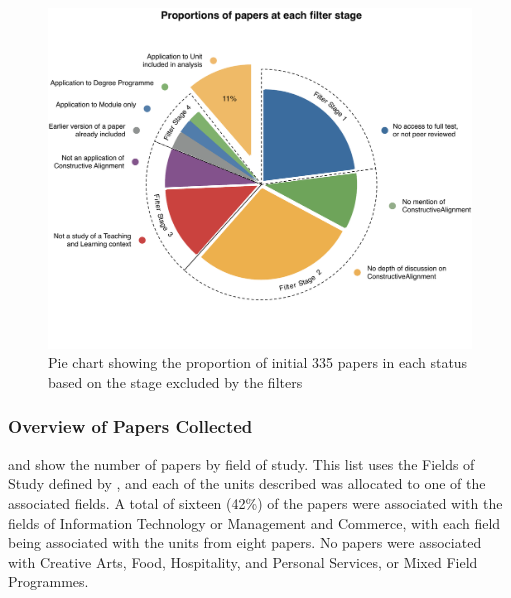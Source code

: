 \begin{figure}[p]
	\centering
	\includegraphics[width=\textwidth]{FilterResults}
	\caption{Pie chart showing the proportion of initial 335 papers in each status based on the stage excluded by the filters}
	\label{fig:filter_results}
\end{figure}

\subsubsection{Overview of Papers Collected} %
\label{sub:overview_of_papers_collected}

 and  show the number of papers by field of study. This list uses the Fields of Study defined by \citet{Trewin:2000}, and each of the units described was allocated to one of the associated fields. A total of sixteen (42\%) of the papers were associated with the fields of Information Technology or Management and Commerce, with each field being associated with the units from eight papers. No papers were associated with Creative Arts, Food, Hospitality, and Personal Services, or Mixed Field Programmes.

